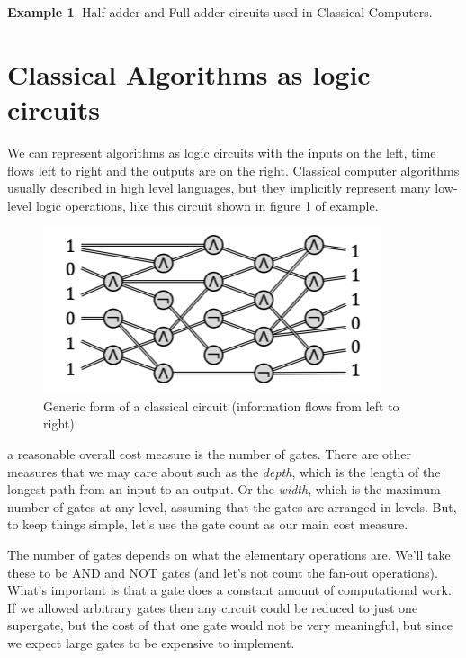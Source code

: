 \documentclass[12pt, oneside]{book}
\theoremstyle{definition}
\theoremstyle{definition}
\newtheorem{example}{Example}[section]
\theoremstyle{remark}
\begin{document}
\begin{example}
    Half adder and Full adder circuits used in Classical Computers.
\end{example}
\section{Classical Algorithms as logic circuits}
We can represent algorithms as logic circuits with the inputs on the left, time flows left to right and the outputs are on the right. Classical computer algorithms usually described in high level languages, but they implicitly represent many low-level logic operations, like this circuit shown in figure \ref{fig:classical-circ} of example.
\begin{figure}
    \centering
    \includegraphics[width=0.5\linewidth]{../images/classical_circ.png}
    \caption{Generic form of a classical circuit (information flows from left to right)}
    \label{fig:classical-circ}
\end{figure}
a reasonable overall cost measure is the number of gates. There are other measures that we may care about such as the \textit{depth}, which is the length of the longest path from an input to an output. Or the \textit{width}, which is the maximum number of gates at any level, assuming that the gates are arranged in levels. But, to keep things simple, let's use the gate count as our main cost measure.

The number of gates depends on what the elementary operations are. We'll take these to be AND and NOT gates (and let's not count the fan-out operations). What's important is that a gate does a constant amount of computational work. If we allowed arbitrary gates then any circuit could be reduced to just one supergate, but the cost of that one gate would not be very meaningful, but since we expect large gates to be expensive to implement.
\end{document}

